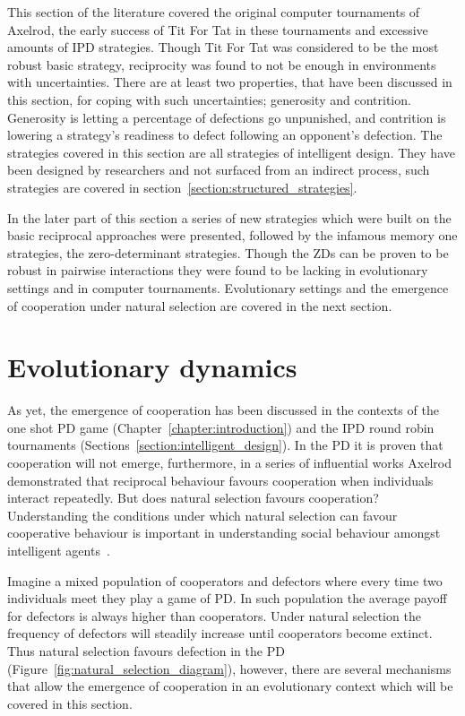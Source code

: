 This section of the literature covered the original computer tournaments of
Axelrod, the early success of Tit For Tat in these tournaments and excessive
amounts of IPD strategies. Though Tit For Tat was
considered to be the most robust basic strategy, reciprocity was found to not
be enough in environments with uncertainties. There are at least two properties,
that have been discussed in this section, for coping with such uncertainties;
generosity and contrition. Generosity is letting a percentage of defections go
unpunished, and contrition is lowering a strategy's readiness to defect
following an opponent's defection. The strategies covered in this section are all
strategies of intelligent design. They have been designed by researchers and
not surfaced from an indirect process, such strategies are covered in
section~\ref{section:structured_strategies}.

In the later part of this section a series of new strategies which were built on
the basic reciprocal approaches were presented, followed by the infamous memory
one strategies, the zero-determinant strategies. Though the ZDs can be proven to be robust
in pairwise interactions they were found to be lacking in evolutionary settings
and in computer tournaments. Evolutionary settings and the emergence
of cooperation under natural selection are covered in the next section.

\section{Evolutionary dynamics}\label{section:evolutionary_dynamics}

As yet, the emergence of cooperation has been discussed in the contexts of the
one shot PD game (Chapter~\ref{chapter:introduction}) and the IPD round robin
tournaments (Sections~\ref{section:intelligent_design}). In the PD it is
proven that cooperation will not emerge, furthermore, in a series of influential works
Axelrod demonstrated that reciprocal behaviour favours cooperation when
individuals interact repeatedly. But does natural selection favours cooperation?
Understanding the conditions under which natural selection can favour
cooperative behaviour is important in understanding social behaviour amongst
intelligent agents~\cite{Boyd1987}.

Imagine a mixed population of cooperators and defectors where every
time two individuals meet they play a game of PD. In such population the average
payoff for defectors is always higher than cooperators. Under natural selection
the frequency of defectors will steadily increase until cooperators become
extinct. Thus natural selection favours defection in the PD
(Figure~\ref{fig:natural_selection_diagram}), however, there are several mechanisms
that allow the emergence of cooperation in an evolutionary context which will be
covered in this section.

